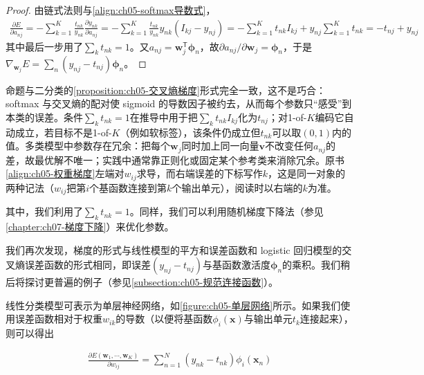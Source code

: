 \documentclass[../../main.tex]{subfiles}
\begin{document}
\begin{proof}
由链式法则与\eqref{align:ch05-softmax导数式}，
\begin{align}
  \frac{\partial E}{\partial a_{nj}}=-\sum_{k=1}^{K}\frac{t_{nk}}{y_{nk}}\frac{\partial y_{nk}}{\partial a_{nj}}=-\sum_{k=1}^{K}\frac{t_{nk}}{y_{nk}}y_{nk}\left(I_{kj}-y_{nj}\right)=-\sum_{k=1}^{K}t_{nk}I_{kj}+y_{nj}\sum_{k=1}^{K}t_{nk}=-t_{nj}+y_{nj}
\end{align}
其中最后一步用了$\sum_k t_{nk}=1$。又$a_{nj}=\boldsymbol{w}_j^{\mathsf{T}}\boldsymbol{\phi}_n$，故$\partial a_{nj}/\partial\boldsymbol{w}_j=\boldsymbol{\phi}_n$，于是$\nabla_{\boldsymbol{w}_j}E=\sum_n(y_{nj}-t_{nj})\boldsymbol{\phi}_n$。
\end{proof}

\begin{remark}
命题与二分类的\cref{proposition:ch05-交叉熵梯度}形式完全一致，这不是巧合：softmax 与交叉熵的配对使 sigmoid 的导数因子被约去，从而每个参数只“感受”到本类的误差。条件$\sum_k t_{nk}=1$在推导中用于把$\sum_k t_{nk}I_{kj}$化为$t_{nj}$；对1-of-$K$编码它自动成立，若目标不是1-of-$K$（例如软标签），该条件仍成立但$t_{nk}$可以取$(0,1)$内的值。多类模型中参数存在冗余：把每个$\boldsymbol{w}_j$同时加上同一向量$\boldsymbol{v}$不改变任何$a_{nj}$的差，故最优解不唯一；实践中通常靠正则化或固定某个参考类来消除冗余。原书\eqref{align:ch05-权重梯度}左端对$w_{ij}$求导，而右端误差的下标写作$k$，这是同一对象的两种记法（$w_{ij}$把第$i$个基函数连接到第$k$个输出单元），阅读时以右端的$k$为准。
\end{remark}

其中，我们利用了$\sum_k t_{nk}=1$。同样，我们可以利用随机梯度下降法（参见\cref{chapter:ch07-梯度下降}）来优化参数。

我们再次发现，梯度的形式与线性模型的平方和误差函数和 logistic 回归模型的交叉熵误差函数的形式相同，即误差$(y_{nj}-t_{nj})$与基函数激活度$\boldsymbol{\phi}_n$的乘积。我们稍后将探讨更普遍的例子（参见\cref{subsection:ch05-规范连接函数}）。

线性分类模型可表示为单层神经网络，如\cref{figure:ch05-单层网络}所示。如果我们使用误差函数相对于权重$w_{ik}$的导数（以便将基函数$\phi_i(\boldsymbol{x})$与输出单元$t_k$连接起来），则可以得出

\begin{align}
  \frac{\partial E(\boldsymbol{w}_1,\cdots,\boldsymbol{w}_K)}{\partial w_{ij}}=\sum_{n=1}^{N}\left(y_{nk}-t_{nk}\right)\phi_i(\boldsymbol{x}_n)
  \label{align:ch05-权重梯度}
\end{align}
\end{document}
